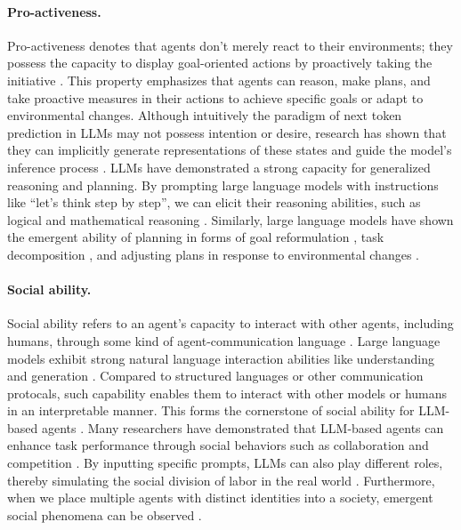 \documentclass{article}
\begin{document}
\paragraph{Pro-activeness.}
Pro-activeness denotes that agents don't merely react to their environments; they possess the capacity to display goal-oriented actions by proactively taking the initiative \cite{DBLP:journals/logcom/Goodwin95}. 
This property emphasizes that agents can reason, make plans, and take proactive measures in their actions to achieve specific goals or adapt to environmental changes.
Although intuitively the paradigm of next token prediction in LLMs may not possess intention or desire, research has shown that they can implicitly generate representations of these states and guide the model's inference process \cite{DBLP:conf/emnlp/Andreas22,DBLP:journals/corr/RadfordJS17,DBLP:conf/acl/LiNA20}. 
LLMs have demonstrated a strong capacity for generalized reasoning and planning. By prompting large language models with instructions like ``let's think step by step'', we can elicit their reasoning abilities, such as logical and mathematical reasoning \cite{DBLP:conf/nips/Wei0SBIXCLZ22,DBLP:conf/nips/KojimaGRMI22,DBLP:conf/iclr/0002WSLCNCZ23}. 
Similarly, large language models have shown the emergent ability of planning in forms of goal reformulation \cite{DBLP:journals/corr/abs-2305-14497,DBLP:journals/corr/abs-2302-06706}, task decomposition \cite{DBLP:conf/iclr/ZhouSHWS0SCBLC23,DBLP:journals/corr/abs-2304-11477}, and adjusting plans in response to environmental changes \cite{shinn2023reflexion,DBLP:journals/corr/abs-2302-02676}. 





\paragraph{Social ability.} 
Social ability refers to an agent's capacity to interact with other agents, including humans, through some kind of agent-communication language \cite{DBLP:journals/cacm/GeneserethK94}.
Large language models exhibit strong natural language interaction abilities like understanding and generation \cite{DBLP:journals/corr/abs-2305-13246, DBLP:journals/corr/abs-2305-13711, DBLP:conf/acl/LinFKD22}. Compared to structured languages or other communication protocals, such capability enables them to interact with other models or humans in an interpretable manner. This forms the cornerstone of social ability for LLM-based agents \cite{DBLP:journals/corr/abs-2304-03442,DBLP:journals/corr/abs-2303-17760}.
Many researchers have demonstrated that LLM-based agents can enhance task performance through social behaviors such as collaboration and competition \cite{DBLP:journals/corr/abs-2303-17760,DBLP:journals/corr/abs-2305-14325,DBLP:journals/corr/abs-2305-10142,DBLP:journals/corr/abs-2307-02485}. 
By inputting specific prompts, LLMs can also play different roles, thereby simulating the social division of labor in the real world \cite{DBLP:journals/corr/abs-2307-07924}.
Furthermore, when we place multiple agents with distinct identities into a society, emergent social phenomena can be observed \cite{DBLP:journals/corr/abs-2304-03442}.
\end{document}
